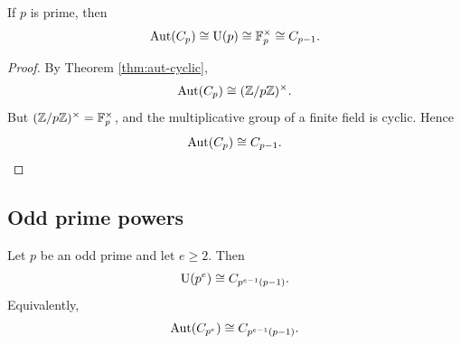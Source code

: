 \begin{corollary}
If $p$ is prime, then
\[
    \operatorname{Aut}(C_p)\cong \mathrm{U}(p)\cong \mathbb{F}_p^\times\cong C_{p-1}.
\]
\end{corollary}

\begin{proof}
By Theorem \ref{thm:aut-cyclic},
\[
    \operatorname{Aut}(C_p)\cong(\mathbb{Z}/p\mathbb{Z})^\times.
\]
But $(\mathbb{Z}/p\mathbb{Z})^\times=\mathbb{F}_p^\times$, and the multiplicative group of a finite field is cyclic. Hence
\[
    \operatorname{Aut}(C_p)\cong C_{p-1}.
\]
\end{proof}

\subsection{Odd prime powers}

\begin{theorem}\label{thm:odd-prime-power}
Let $p$ be an odd prime and let $e\geq 2$. Then
\[
    \mathrm{U}(p^e)\cong C_{p^{e-1}(p-1)}.
\]
Equivalently,
\[
    \operatorname{Aut}(C_{p^e})\cong C_{p^{e-1}(p-1)}.
\]
\end{theorem}

